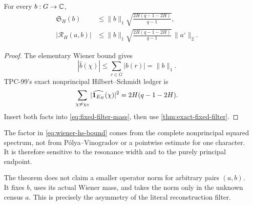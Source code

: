 \begin{theorem}
\label{thm:wiener-hs}
For every \(b:G\to\mathbb C\),
\begin{align}
 \mathfrak S_H(b)
 &\le
 \|b\|_1
 \sqrt{\frac{2H(q-1-2H)}{q-1}},
\label{eq:wiener-hs-mass}\\
 |\mathcal R_H(a,b)|
 &\le
 \|b\|_1
 \sqrt{\frac{2H(q-1-2H)}{q-1}}\,
 \|a^\circ\|_2.
\label{eq:wiener-hs-bound}
\end{align}
\end{theorem}

\begin{proof}
The elementary Wiener bound gives
\[
 |\widehat b(\chi)|\le\sum_{r\in G}|b(r)|=\|b\|_1.
\]
TPC-99's exact nonprincipal Hilbert--Schmidt ledger is
\[
 \sum_{\chi\ne\chi_0}
 |\widehat{\mathbf 1_{E_H}}(\chi)|^2
 =
 2H(q-1-2H).
\]
Insert both facts into \eqref{eq:fixed-filter-mass}, then use
\cref{thm:exact-fixed-filter}.
\end{proof}

\begin{remark}
The factor in \eqref{eq:wiener-hs-bound} comes from the complete
nonprincipal squared spectrum, not from P\'olya--Vinogradov or a
pointwise estimate for one character.  It is therefore sensitive to
the resonance width and to the purely principal endpoint.
\end{remark}

\begin{remark}
The theorem does not claim a smaller operator norm for arbitrary
pairs \((a,b)\).  It fixes \(b\), uses its actual Wiener mass, and
takes the norm only in the unknown census \(a\).  This is precisely
the asymmetry of the literal reconstruction filter.
\end{remark}
